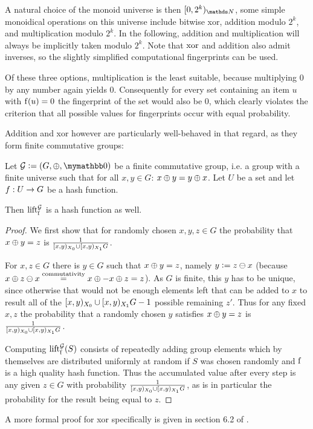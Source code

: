 A natural choice of the monoid universe is then $\interval{0}{2^k}{\N}$, some simple monoidical operations on this universe include bitwise xor, addition modulo $2^k$, and multiplication modulo $2^k$. In the following, addition and multiplication will always be implicitly taken modulo $2^k$. Note that $\operatorname{xor}$ and addition also admit inverses, so the slightly simplified computational fingerprints can be used.

Of these three options, multiplication is the least suitable, because multiplying $0$ by any number again yields $0$. Consequently for every set containing an item $u$ with $\operatorname{f}(u) = 0$ the fingerprint of the set would also be $0$, which clearly violates the criterion that all possible values for fingerprints occur with equal probability.

Addition and xor however are particularly well-behaved in that regard, as they form finite commutative groups:

\begin{proposition}
Let $\mathcal{G} \defeq (G, \groupaddsym, \neutraladd)$ be a finite commutative group, i.e. a group with a finite universe such that for all $x, y \in G$: ${x} \oplus {y} = {y} \oplus {x}$. Let $U$ be a set and let ${f}: {U} \rightarrow {G}$ be a hash function.

Then $\operatorname{lift_{\operatorname{f}}^{\mathcal{G}}}$ is a hash function as well.

\begin{proof}
We first show that for randomly chosen $x, y, z \in G$ the probability that ${x} \oplus {y} = z$ is $\frac{1}{[{x},{y})_{X_0} \cup [{x},{y})_{X_1}{G}}$.

For $x, z \in G$ there is $y \in G$ such that ${x} \oplus {y} = z$, namely $y \vcentcolon= {z} \ominus {x}$ (because ${x} \oplus {{z} \ominus {x}} \overset{\text{commutativity}}= {{x} \oplus {-{x}}} \oplus {z} = z$). As $G$ is finite, this $y$ has to be unique, since otherwise that would not be enough elements left that can be added to $x$ to result all of the $[{x},{y})_{X_0} \cup [{x},{y})_{X_1}{G} - 1$ possible remaining $z'$. Thus for any fixed $x, z$ the probability that a randomly chosen $y$ satisfies ${x} \oplus {y} = z$ is $\frac{1}{[{x},{y})_{X_0} \cup [{x},{y})_{X_1}{G}}$.

Computing $\operatorname{lift_{\operatorname{f}}^{\mathcal{G}}}(S)$ consists of repeatedly adding group elements which by themselves are distributed uniformly at random if $S$ was chosen randomly and $\operatorname{f}$ is a high quality hash function. Thus the accumulated value after every step is any given $z \in G$ with probability $\frac{1}{[{x},{y})_{X_0} \cup [{x},{y})_{X_1}{G}}$, as is in particular the probability for the result being equal to $z$.
\end{proof}

A more formal proof for xor specifically is given in section 6.2 of \cite{maziarz2021hashing}.
\end{proposition}

